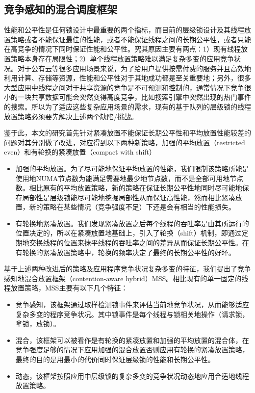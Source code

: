 \subsection{竞争感知的混合调度框架}
性能和公平性是任何锁设计中最重要的两个指标，而目前的层级锁设计及其线程放置策略或者不能保证最佳的性能，或者不能保证线程之间的长期公平性，或者只能在高竞争的情况下同时保证性能和公平性。究其原因主要有两点：1）现有线程放置策略本身存在局限性；2）单个线程放置策略难以满足复杂多变的应用竞争状况。对于公有云等很多应用场景来说，为了给用户提供按需付费的服务并且高效地利用计算、存储等资源，性能和公平性对于其地成功都是至关重要地\cite{rao2014towards}；另外，很多大型应用中线程之间对于共享资源的竞争是不可预测和控制的，通常情况下竞争很小的一块共享数据可能会突然变得高度竞争，比如搜索引擎中突然出现的热门事件的搜索\cite{chabbi2016contention}。所以为了适应这些复杂应用场景的需求，现有的基于队列的层级锁的线程放置策略必须要先解决上述两个缺陷/挑战。

鉴于此，本文的研究首先针对紧凑放置不能保证长期公平性和平均放置性能较差的问题对其分别做了改进，对应得到以下两种新策略，加强的平均放置（restricted even）和有轮换的紧凑放置（compact with shift）
\begin{itemize}
\item 加强的平均放置。为了尽可能地保证平均放置的性能，我们限制该策略所能是使用地NUMA节点数为能满足需要地最少地节点数，而不是全部可用地节点数。相比原有的平均放置策略，新的策略在保证长期公平性地同时尽可能地保存局部性是层级锁能尽可能地挖掘局部性从而保证高性能，然而相比紧凑放置，新的策略在某些情况（竞争强度不足）下还是会有相当的性能损失。
\item 有轮换地紧凑放置。我们发现紧凑放置之后每个线程的吞吐率是由其所运行的位置决定的，所以在紧凑放置地基础上，引入了轮换（shift）机制，即通过定期地交换线程的位置来抹平线程的吞吐率之间的差异从而保证长期公平性。在有轮换的紧凑放置策略中，轮换的频率决定了最终的长期公平性的好坏。
\end{itemize}
基于上述两种改进后的策略及应用程序竞争状况复杂多变的特征，我们提出了竞争感知地混合放置框架（contention-aware hybrid）MSS。相比现有的单一固定的线程放置策略，MSS主要有以下几个特征：
\begin{itemize}
\item 竞争感知，该框架通过取样检测锁事件来评估当前地竞争状况，从而能够适应复杂多变的程序竞争状况。其中锁事件是每个线程与锁相关地操作（请求锁，拿锁，放锁）。
\item 混合，该框架可以被看作是有轮换的紧凑放置和加强的平均放置的混合体，在竞争强度足够的情况下应用加强的混合放置否则应用有轮换的紧凑放置策略，最终的目的是用最小的代价同时保证层级锁的性能和长期公平性。
\item 动态，该框架按照应用中层级锁的复杂多变的竞争状况动态地应用合适地线程放置策略。
\end{itemize}

